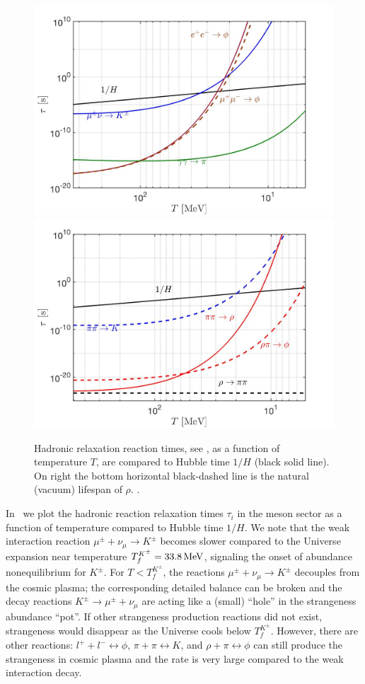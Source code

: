 \begin{figure}
\centerline{\includegraphics[width=0.5\linewidth]{./plots/Strangeness_Hubble002.jpg}
\includegraphics[width=0.5\linewidth]{./plots/Strangeness_Hubble003.jpg}}
\caption{Hadronic relaxation reaction times, see , as a function of temperature $T$, are compared to Hubble time $1/H$ (black solid line). On right the bottom horizontal black-dashed line is the natural (vacuum) lifespan of $\rho$. . }
\label{reaction_time_tot} 
\end{figure}

In~ we plot the hadronic reaction relaxation times $\tau_{i}$ in the meson sector as a function of temperature compared to Hubble time $1/H$. We note that the weak interaction reaction $\mu^\pm+\nu_{\mu}\rightarrow K^\pm$ becomes slower compared to the Universe expansion near temperature $T_f^{K^\pm}=33.8\text{\,MeV}$, signaling the onset of abundance nonequilibrium for $K^\pm$. For $T<T_f^{K^\pm}$, the reactions $\mu^\pm+\nu_{\mu}\rightarrow K^\pm$ decouples from the cosmic plasma; the corresponding detailed balance can be broken and the decay reactions $K^\pm\rightarrow\mu^\pm+\nu_{\mu}$ are acting like a (small) ``hole'' in the strangeness abundance ``pot''. If other strangeness production reactions did not exist, strangeness would disappear as the Universe cools below $T_f^{K^\pm}$. However, there are other reactions: $l^++l^-\leftrightarrow\phi$, $\pi+\pi\leftrightarrow K$, and $\rho+\pi\leftrightarrow\phi$ can still produce the strangeness in cosmic plasma and the rate is very large compared to the weak interaction decay.


